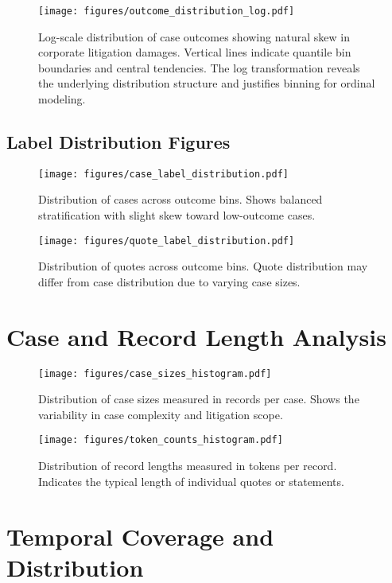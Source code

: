 \documentclass[11pt]{article}
\begin{document}
\begin{figure}[H]
\centering
\texttt{[image: figures/outcome\_distribution\_log.pdf]}
\caption{Log-scale distribution of case outcomes showing natural skew in corporate litigation damages. Vertical lines indicate quantile bin boundaries and central tendencies. The log transformation reveals the underlying distribution structure and justifies binning for ordinal modeling.}
\end{figure}

\subsection{Label Distribution Figures}

\begin{figure}[H]
\centering
\texttt{[image: figures/case\_label\_distribution.pdf]}
\caption{Distribution of cases across outcome bins. Shows balanced stratification with slight skew toward low-outcome cases.}
\end{figure}

\begin{figure}[H]
\centering
\texttt{[image: figures/quote\_label\_distribution.pdf]}
\caption{Distribution of quotes across outcome bins. Quote distribution may differ from case distribution due to varying case sizes.}
\end{figure}

\section{Case and Record Length Analysis}

\begin{figure}[H]
\centering
\texttt{[image: figures/case\_sizes\_histogram.pdf]}
\caption{Distribution of case sizes measured in records per case. Shows the variability in case complexity and litigation scope.}
\end{figure}

\begin{figure}[H]
\centering
\texttt{[image: figures/token\_counts\_histogram.pdf]}
\caption{Distribution of record lengths measured in tokens per record. Indicates the typical length of individual quotes or statements.}
\end{figure}

\section{Temporal Coverage and Distribution}
\end{document}
